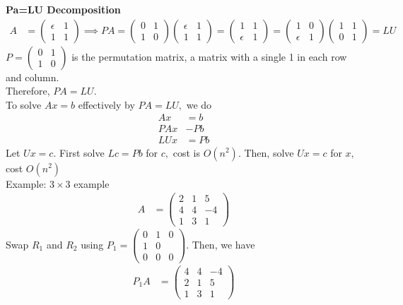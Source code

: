 \documentclass[11pt,oneside]{book}
\theoremstyle{break}
\theoremstyle{break}
\newcommand{\example}{\color{purple}Example: \color{black}}
\begin{document}
\textbf{Pa=LU Decomposition}\begin{align*}
A&=\begin{pmatrix}
\epsilon&1\\
1&1
\end{pmatrix}\implies PA=\begin{pmatrix}
0&1\\
1&0
\end{pmatrix}\begin{pmatrix}
\epsilon&1\\
1&1
\end{pmatrix}=\begin{pmatrix}
1&1\\
\epsilon&1
\end{pmatrix}=\begin{pmatrix}
1&0\\
\epsilon&1
\end{pmatrix}\begin{pmatrix}
1&1\\
0&1
\end{pmatrix}=LU
\end{align*}
$P=\begin{pmatrix}
0&1\\
1&0
\end{pmatrix}$ is the permutation matrix, a matrix with a single 1 in each row and column.\\
Therefore, $PA=LU$.\\
To solve $Ax=b$ effectively by $PA=LU,$ we do \begin{align*}
Ax&=b\\
PAx&-Pb\\
LUx&=Pb
\end{align*}
Let $Ux=c.$ First solve $Lc=Pb$ for $c,$ cost is $O(n^2)$. Then, solve $Ux=c$ for $x,$ cost $O(n^2)$\\
\example $3\times 3$ example \begin{align*}
A&=\begin{pmatrix}
2&1&5\\
4&4&-4\\
1&3&1
\end{pmatrix}
\end{align*}
Swap $R_1$ and $R_2$ using $P_1=\begin{pmatrix}
0&1&0\\
1&0&\\
0&0&0
\end{pmatrix}$. Then, we have \begin{align*}
P_1A&=\begin{pmatrix}
4&4&-4\\
2&1&5\\
1&3&1
\end{pmatrix}
\end{align*}
\end{document}
